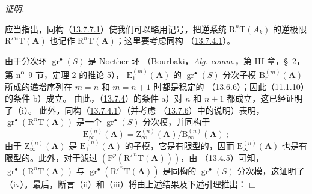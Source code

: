 \documentclass[UTF8,fontset=none,11pt,oneside,openany]{ctexbook}
\providecommand{\square}{\mdlgwhtsquare}
\newenvironment{proof}{%
  \par\smallskip\noindent\textit{证明.}\ %
}{\hfill$\square$\par}
\begin{document}
\begin{proof}
应当指出，同构（\hyperref[0.13.7.7.1-fr]{13.7.7.1}）使我们可以略用记号，把逆系统
$\mathrm R^n\mathrm T(A_k)$ 的逆极限
$\mathrm R'^{\,n}\mathrm T(\mathbf A)$ 也记作 $\mathrm R^n\mathrm T(\mathbf A)$；这里要考虑同构
（\hyperref[0.13.7.4.1-fr]{13.7.4.1}）。

由于分次环 $\operatorname{gr}^\bullet(S)$ 是 Noether 环
（Bourbaki，\emph{Alg. comm.}，第 III 章，\S~2，第
n\textsuperscript{o}~9 节，定理 2 的推论 5），
$\mathrm E_1^{(m)}(\mathbf A)$ 的
$\operatorname{gr}^\bullet(S)$-分次子模
$\mathrm B_r^{(m)}(\mathbf A)$ 所成的递增序列在 $m=n$ 和 $m=n+1$ 时都是稳定的
（\hyperref[0.13.6.6-fr]{13.6.6}）；因此（\hyperref[0.11.1.10-fr]{11.1.10}）的条件 b）成立。
由此，（\hyperref[0.13.7.4-fr]{13.7.4}）的条件 a）对 $n$ 和 $n+1$ 都成立，这已经证明了（i）。
此外，同构（\hyperref[0.13.7.4.1-fr]{13.7.4.1}）（并考虑
（\hyperref[0.13.7.6-fr]{13.7.6}）中的说明）表明，
$\operatorname{gr}^\bullet(\mathrm R^n\mathrm T(\mathbf A))$ 是一个
$\operatorname{gr}^\bullet(S)$-分次模，并同构于
\[
\mathrm E_\infty^{(n)}(\mathbf A)=
\mathrm Z_\infty^{(n)}(\mathbf A)/\mathrm B_\infty^{(n)}(\mathbf A)~;
\]
由于 $\mathrm Z_\infty^{(n)}(\mathbf A)$ 是
$\mathrm E_1^{(n)}(\mathbf A)$ 的子模，它是有限型的，因而
$\mathrm E_\infty^{(n)}(\mathbf A)$ 也是有限型的。此外，对于滤过
$(\mathrm F^p(\mathrm R'^{\,n}\mathrm T(\mathbf A)))$，由
（\hyperref[0.13.4.5-fr]{13.4.5}）可知，
$\operatorname{gr}^\bullet(\mathrm R^n\mathrm T(\mathbf A))$ 与
$\operatorname{gr}^\bullet(\mathrm R'^{\,n}\mathrm T(\mathbf A))$ 是同构的
$\operatorname{gr}^\bullet(S)$-分次模，这证明了（iv）。最后，断言（ii）和（iii）将由上述结果及下述引理推出：
\end{proof}
\end{document}
